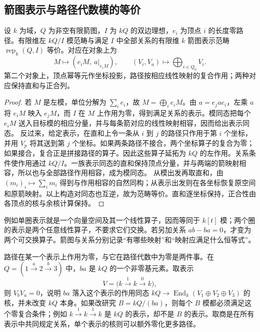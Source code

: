 \subsection{箭图表示与路径代数模的等价}
\label{b5:subsec:0902:02}

\begin{theorem}\label{b5:thm:quiver-module-equivalence}
	设 \(k\) 为域，\(Q\) 为非空有限箭图，\(I\) 为 \(kQ\) 的双边理想，\(e_i\) 为顶点 \(i\) 的长度零路径。有限维左 \(kQ/I\) 模范畴与满足 \(I\) 中全部关系的有限维 \(k\) 箭图表示范畴 \(\operatorname{rep}_k(Q,I)\) 等价。对应在对象上为
	\[
		M\longmapsto(e_iM,\ a|_{e_iM}),\qquad (V_i,V_a)\longmapsto\bigoplus_{i\in Q_0}V_i.
	\]
	第二个对象上，顶点幂等元作坐标投影，路径按相应线性映射的复合作用；两种对应保持直和与正合列。
\end{theorem}
\begin{proof}
	若 \(M\) 是左模，单位分解为 \(\sum_i e_i\)，故 \(M=\bigoplus_i e_iM\)。由 \(a=e_jae_i\)，左乘 \(a\) 将 \(e_iM\) 映入 \(e_jM\)，而 \(I\) 在 \(M\) 上作用为零，得到满足关系的表示。模同态把每个 \(e_iM\) 送入目标模的相应分量，并与每条箭对应的线性映射相容，因而给出表示同态。 反过来，给定表示，在直和上令一条从 \(i\) 到 \(j\) 的路径只作用于第 \(i\) 个坐标，并用 \(V_p\) 将其送到第 \(j\) 个坐标。如果两条路径不接合，两个坐标算子的复合为零；如果接合，复合正是拼接路径的算子。因此这些算子延拓为 \(kQ\) 的左作用。关系条件使作用通过 \(kQ/I\)。一族表示同态的直和保持顶点分量，并与两端的箭映射相容，所以也与全部路径作用相容，成为模同态。 从模出发再取直和，由 \((m_i)_i\mapsto\sum_i m_i\) 得到与作用相容的自然同构；从表示出发则在各坐标恢复原空间和原箭映射。以上构造对同态也互逆，故为范畴等价。直和逐坐标保持，正合性由各顶点的核与余核计算保持。
\end{proof}
例如单圈表示就是一个向量空间及其一个线性算子，因而等同于 \(k[t]\) 模；两个圈的表示是两个任意线性算子，不要求它们交换。若另加关系 \(ab-ba=0\)，才变为两个可交换算子。箭图与关系分别记录“有哪些映射”和“映射应满足什么恒等式”。

\ProseParagraphBreak

路径在某一个表示上作用为零，与它在路径代数中为零是两件事。在 \(Q=(1\xrightarrow{a}2\xrightarrow{b}3)\) 中，\(ba\) 是 \(kQ\) 的一个非零基元素。取表示
\[
	V=\bigl(k\xrightarrow{1}k\xrightarrow{0}k\bigr),
\]
则 \(V_bV_a=0\)，说明 \(ba\) 落入这个表示的作用同态 \(kQ\to\operatorname{End}_k(V_1\oplus V_2\oplus V_3)\) 的核，并未改变 \(kQ\) 本身。如果改研究 \(B=kQ/(ba)\)，则每个 \(B\) 模都必须满足这个零复合条件；例如 \(k\xrightarrow{1}k\xrightarrow{1}k\) 是 \(kQ\) 的表示，却不是 \(B\) 的表示。取商是在所有表示中共同规定关系，单个表示的核则可以额外零化更多路径。

